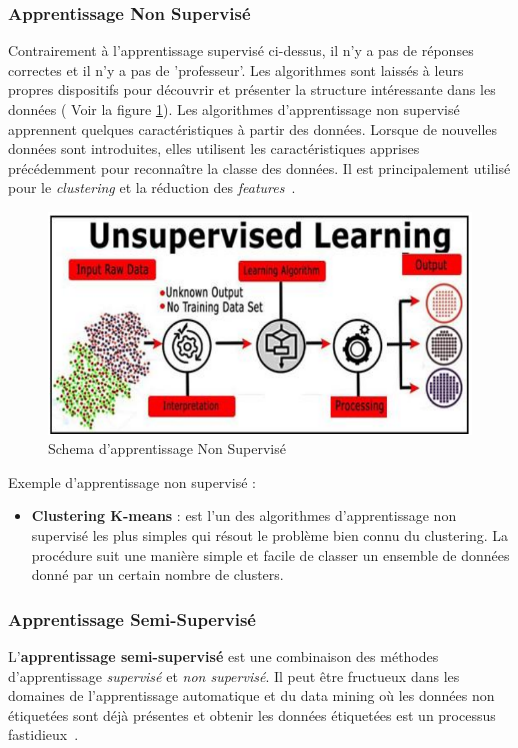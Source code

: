 \subsubsection{Apprentissage Non Supervisé}
Contrairement à l'apprentissage supervisé ci-dessus, il n'y a pas de réponses correctes et il n'y a pas de 'professeur'. Les algorithmes sont laissés à leurs propres dispositifs pour découvrir et présenter la structure intéressante dans les données ( Voir la figure \ref{fig:unsupervisedlearning}). Les algorithmes d'apprentissage non supervisé apprennent quelques caractéristiques à partir des données. Lorsque de nouvelles données sont introduites, elles utilisent les caractéristiques apprises précédemment pour reconnaître la classe des données. Il est principalement utilisé pour le \textit{clustering} et la réduction des \textit{features}~\cite{Machine2020Batta}.

\begin{figure}[!h]
	\centering
	\includegraphics[width=0.8\linewidth]{images/unsupervisedlearning}
	\caption{Schema d'apprentissage Non Supervisé~\cite{lsupervised}}
	\label{fig:unsupervisedlearning}
\end{figure}

Exemple d'apprentissage non supervisé :
\begin{itemize}
	\item \textbf{Clustering K-means} : est l'un des algorithmes d'apprentissage non supervisé les plus simples qui résout le problème bien connu du clustering. La procédure suit une manière simple et facile de classer un ensemble de données donné par un certain nombre de clusters.
\end{itemize}

\subsubsection{Apprentissage Semi-Supervisé}
L'\textbf{apprentissage semi-supervisé} est une combinaison des méthodes d'apprentissage \textit{supervisé} et \textit{non supervisé}. Il peut être fructueux dans les domaines de l'apprentissage automatique et du data mining où les données non étiquetées sont déjà présentes et obtenir les données étiquetées est un processus fastidieux~\cite{Machine2020Batta}. 

